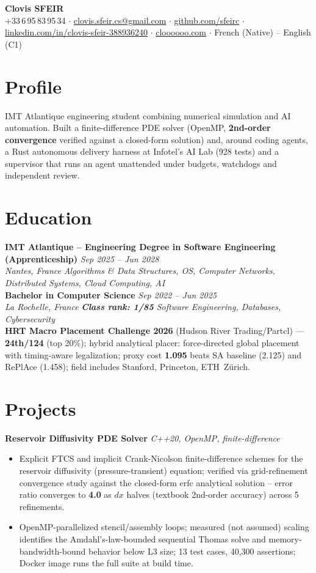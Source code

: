\documentclass[10pt]{article}
\newcommand{\entry}[4]{%
  \noindent\textbf{#1} \hfill \textit{#2} \\
  \textit{#3} \hfill \textit{#4}\\[-0.22em]
}
\newcommand{\projectentry}[2]{%
  \noindent\textbf{#1} \hfill \textit{#2}\\[-0.3em]
}
\begin{document}
\fontsize{9.3pt}{11pt}\selectfont
\begin{center}
  {\LARGE \textbf{Clovis SFEIR}}\\[0.3em]
  +33\,6\,95\,83\,95\,34 \;$\cdot$\; \href{mailto:clovis.sfeir.cs@gmail.com}{clovis.sfeir.cs@gmail.com} \;$\cdot$\;
  \href{https://github.com/sfeirc}{github.com/sfeirc} \;$\cdot$\;
  \href{https://linkedin.com/in/clovis-sfeir-388936240}{linkedin.com/in/clovis-sfeir-388936240} \;$\cdot$\;
  \href{https://cloooooo.com}{cloooooo.com} \;$\cdot$\; French (Native) -- English (C1)
\end{center}

\section*{Profile}
IMT Atlantique engineering student combining numerical simulation and AI automation. Built a finite-difference PDE solver (OpenMP, \textbf{2nd-order convergence} verified against a closed-form solution) and, around coding agents, a Rust autonomous delivery harness at Infotel's AI Lab (928 tests) and a supervisor that runs an agent unattended under budgets, watchdogs and independent review.

\section*{Education}
\entry{IMT Atlantique -- Engineering Degree in Software Engineering (Apprenticeship)}{Sep 2025 -- Jun 2028}{Nantes, France}{Algorithms \& Data Structures, OS, Computer Networks, Distributed Systems, Cloud Computing, AI}
\entry{Bachelor in Computer Science}{Sep 2022 -- Jun 2025}{La Rochelle, France}{\textbf{Class rank: 1/85} \textbar{} Software Engineering, Databases, Cybersecurity}
\noindent\textbf{HRT Macro Placement Challenge 2026} (Hudson River Trading/Partcl) --- \textbf{24th/124} (top 20\%); hybrid analytical placer: force-directed global placement with timing-aware legalization; proxy cost \textbf{1.095} beats SA baseline (2.125) and RePlAce (1.458); field includes Stanford, Princeton, ETH~Z\"urich.

\section*{Projects}

\projectentry{Reservoir Diffusivity PDE Solver}{C++20, OpenMP, finite-difference}
\begin{itemize}
  \item Explicit FTCS and implicit Crank-Nicolson finite-difference schemes for the reservoir diffusivity (pressure-transient) equation; verified via grid-refinement convergence study against the closed-form erfc analytical solution -- error ratio converges to \textbf{4.0} as $dx$ halves (textbook 2nd-order accuracy) across 5 refinements.
  \item OpenMP-parallelized stencil/assembly loops; measured (not assumed) scaling identifies the Amdahl's-law-bounded sequential Thomas solve and memory-bandwidth-bound behavior below L3 size; 13 test cases, 40{,}300 assertions; Docker image runs the full suite at build time.
\end{itemize}
\end{document}
